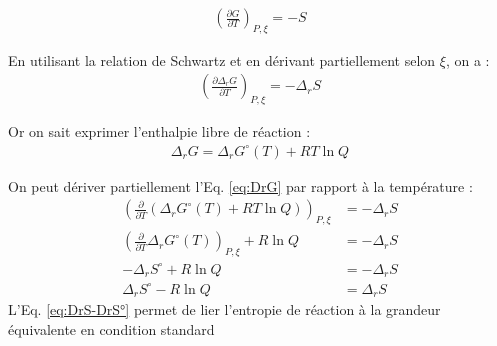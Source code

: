 \documentclass[twoside,a4paper,11pt,addpoints]{exam}%
\begin{document}
\begin{align}
\left( \frac{\partial G}{\partial T} \right)_{P, \xi} = - S \label{eq:def_S}
\end{align}

En utilisant la relation de Schwartz et en dérivant partiellement selon $\xi$, on a : 
\begin{align}
\left( \frac{\partial \Delta_r G}{\partial T} \right)_{P, \xi} = - \Delta_r S
\end{align}

Or on sait exprimer l'enthalpie libre de réaction : 
\begin{align}
\Delta_r G = \Delta_r G^\circ (T) + RT \ln Q
\label{eq:DrG}
\end{align}

On peut dériver partiellement l'Eq. \ref{eq:DrG} par rapport à la température : 
\begin{align}
\left( \frac{\partial}{\partial T} (\Delta_r G^\circ (T) + RT \ln Q) \right)_{P, \xi} &= - \Delta_r S \\
\left( \frac{\partial}{\partial T} \Delta_r G^\circ (T)\right)_{P, \xi}  + R \ln Q   &= - \Delta_r S \\
-\Delta_r S^\circ  + R \ln Q  &= - \Delta_r S \\
\Delta_r S^\circ  - R \ln Q  &= \Delta_r S \label{eq:DrS-DrS°}
\end{align}
L'Eq. \ref{eq:DrS-DrS°} permet de lier l'entropie de réaction à la grandeur équivalente en condition standard
\end{document}

